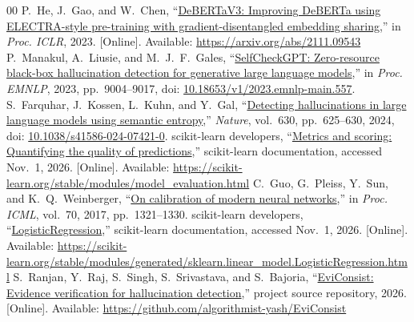 \documentclass[conference,a4paper]{IEEEtran}
\begin{document}
\begin{thebibliography}{00}
 P.~He, J.~Gao, and W.~Chen, ``\href{https://arxiv.org/abs/2111.09543}{DeBERTaV3: Improving DeBERTa using ELECTRA-style pre-training with gradient-disentangled embedding sharing},'' in \emph{Proc. ICLR}, 2023. [Online]. Available: \url{https://arxiv.org/abs/2111.09543}
 P.~Manakul, A.~Liusie, and M.~J.~F.~Gales, ``\href{https://aclanthology.org/2023.emnlp-main.557/}{SelfCheckGPT: Zero-resource black-box hallucination detection for generative large language models},'' in \emph{Proc. EMNLP}, 2023, pp.~9004--9017, doi: \href{https://doi.org/10.18653/v1/2023.emnlp-main.557}{10.18653/v1/2023.emnlp-main.557}.
 S.~Farquhar, J.~Kossen, L.~Kuhn, and Y.~Gal, ``\href{https://www.nature.com/articles/s41586-024-07421-0}{Detecting hallucinations in large language models using semantic entropy},'' \emph{Nature}, vol.~630, pp.~625--630, 2024, doi: \href{https://doi.org/10.1038/s41586-024-07421-0}{10.1038/s41586-024-07421-0}.
 scikit-learn developers, ``\href{https://scikit-learn.org/stable/modules/model_evaluation.html}{Metrics and scoring: Quantifying the quality of predictions},'' scikit-learn documentation, accessed Nov.~1, 2026. [Online]. Available: \url{https://scikit-learn.org/stable/modules/model_evaluation.html}
 C.~Guo, G.~Pleiss, Y.~Sun, and K.~Q.~Weinberger, ``\href{https://proceedings.mlr.press/v70/guo17a.html}{On calibration of modern neural networks},'' in \emph{Proc. ICML}, vol.~70, 2017, pp.~1321--1330.
 scikit-learn developers, ``\href{https://scikit-learn.org/stable/modules/generated/sklearn.linear_model.LogisticRegression.html}{LogisticRegression},'' scikit-learn documentation, accessed Nov.~1, 2026. [Online]. Available: \url{https://scikit-learn.org/stable/modules/generated/sklearn.linear_model.LogisticRegression.html}
 S.~Ranjan, Y.~Raj, S.~Singh, S.~Srivastava, and S.~Bajoria, ``\href{https://github.com/algorithmist-yash/EviConsist}{EviConsist: Evidence verification for hallucination detection},'' project source repository, 2026. [Online]. Available: \url{https://github.com/algorithmist-yash/EviConsist}
\end{thebibliography}
\end{document}
